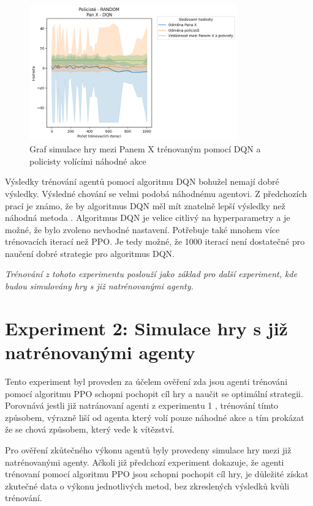 \begin{figure}[H]\label{fig:cop_random_mrx_dqn}
	\centering
	\includegraphics[width=0.8\textwidth]{obrazky-figures/graphs/cop_RANDOM_mrx_DQN.png}
	\caption{Graf simulace hry mezi Panem X trénovaným pomocí DQN a policisty volícími náhodné akce}
\end{figure}

Výsledky trénování agentů pomocí algoritmu DQN bohužel nemají dobré výsledky.
Výsledné chování se velmi podobá náhodnému agentovi.
Z předchozích prací je známo, že by algoritmus DQN měl mít znatelně lepší výsledky než náhodná metoda \cite{Hrklova2023thesis}.
Algoritmus DQN je velice citlivý na hyperparametry a je možné, že bylo zvoleno nevhodné nastavení.
Potřebuje také mnohem více trénovacích iterací než PPO\@.
Je tedy možné, že 1000 iterací není dostatečné pro naučení dobré strategie pro algoritmus DQN.

\emph{Trénování z tohoto experimentu poslouží jako základ pro další experiment, kde budou simulovány hry s již natrénovanými agenty.}

\section{Experiment 2: Simulace hry s již natrénovanými agenty}
\label{sec:experiment-2}

Tento experiment byl proveden za účelem ověření zda jsou agenti trénováni pomocí algoritmu PPO schopni pochopit cíl hry a naučit se optimální strategii.
Porovnává jestli již natránovaní agenti z experimentu 1 , trénování tímto způsobem, výrazně liší od agenta který volí pouze náhodné akce a tím prokázat že se chová způsobem, který vede k vítězství.

Pro ověření zkůtečného výkonu agentů byly provedeny simulace hry mezi již natrénovanými agenty.
Ačkoli již předchozí experiment dokazuje, že agenti trénovaní pomocí algoritmu PPO jsou schopni pochopit cíl hry, je důležité získat zkutečné data o výkonu jednotlivých metod, bez zkreslených výsledků kvůli trénování.



